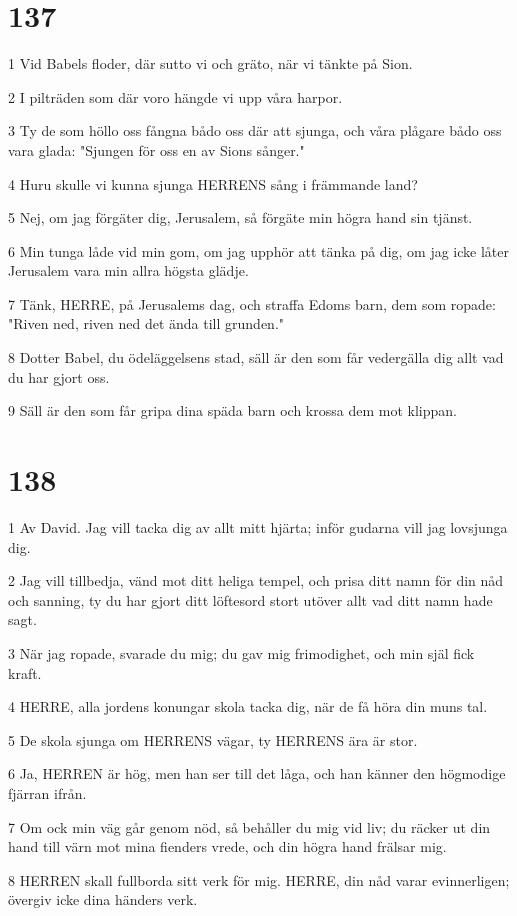 \chapter{137}

\par 1 Vid Babels floder, där sutto vi och gräto, när vi tänkte på Sion.
\par 2 I pilträden som där voro hängde vi upp våra harpor.
\par 3 Ty de som höllo oss fångna bådo oss där att sjunga, och våra plågare bådo oss vara glada: "Sjungen för oss en av Sions sånger."
\par 4 Huru skulle vi kunna sjunga HERRENS sång i främmande land?
\par 5 Nej, om jag förgäter dig, Jerusalem, så förgäte min högra hand sin tjänst.
\par 6 Min tunga låde vid min gom, om jag upphör att tänka på dig, om jag icke låter Jerusalem vara min allra högsta glädje.
\par 7 Tänk, HERRE, på Jerusalems dag, och straffa Edoms barn, dem som ropade: "Riven ned, riven ned det ända till grunden."
\par 8 Dotter Babel, du ödeläggelsens stad, säll är den som får vedergälla dig allt vad du har gjort oss.
\par 9 Säll är den som får gripa dina späda barn och krossa dem mot klippan.

\chapter{138}

\par 1 Av David. Jag vill tacka dig av allt mitt hjärta; inför gudarna vill jag lovsjunga dig.
\par 2 Jag vill tillbedja, vänd mot ditt heliga tempel, och prisa ditt namn för din nåd och sanning, ty du har gjort ditt löftesord stort utöver allt vad ditt namn hade sagt.
\par 3 När jag ropade, svarade du mig; du gav mig frimodighet, och min själ fick kraft.
\par 4 HERRE, alla jordens konungar skola tacka dig, när de få höra din muns tal.
\par 5 De skola sjunga om HERRENS vägar, ty HERRENS ära är stor.
\par 6 Ja, HERREN är hög, men han ser till det låga, och han känner den högmodige fjärran ifrån.
\par 7 Om ock min väg går genom nöd, så behåller du mig vid liv; du räcker ut din hand till värn mot mina fienders vrede, och din högra hand frälsar mig.
\par 8 HERREN skall fullborda sitt verk för mig. HERRE, din nåd varar evinnerligen; övergiv icke dina händers verk.

